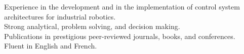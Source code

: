 \begin{cvskills}

\cvannouncement
{Experience in the development and in the implementation of control system architectures for industrial robotics.}\\
\cvannouncement
{Strong analytical, problem solving, and decision making.}\\
\cvannouncement
{Publications in prestigious peer-reviewed journals, books, and conferences.}\\
\cvannouncement
{Fluent in English and French.}











\end{cvskills}